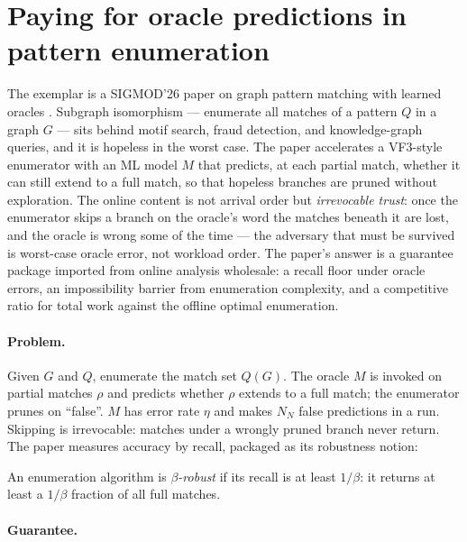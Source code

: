 \section{Paying for oracle predictions in pattern enumeration}
\label{sec:onl-oracle}

The exemplar is a SIGMOD'26 paper on graph pattern matching with learned
oracles \citep{sigmod26-094}. Subgraph isomorphism --- enumerate all matches of
a pattern $Q$ in a graph $G$ --- sits behind motif search, fraud detection, and
knowledge-graph queries, and it is hopeless in the worst case. The paper
accelerates a VF3-style enumerator with an ML model $M$ that predicts, at each
partial match, whether it can still extend to a full match, so that hopeless
branches are pruned without exploration. The online content is not arrival
order but \emph{irrevocable trust}: once the enumerator skips a branch on the
oracle's word the matches beneath it are lost, and the oracle is wrong some of
the time --- the adversary that must be survived is worst-case oracle error,
not workload order. The paper's answer is a guarantee package imported from
online analysis wholesale: a recall floor under oracle errors, an
impossibility barrier from enumeration complexity, and a competitive ratio for
total work against the offline optimal enumeration.

\paragraph{Problem.}
Given $G$ and $Q$, enumerate the match set $Q(G)$. The oracle $M$ is invoked
on partial matches $\rho$ and predicts whether $\rho$ extends to a full match;
the enumerator prunes on ``false''. $M$ has error rate $\eta$ and makes $N_N$
false predictions in a run. Skipping is irrevocable: matches under a wrongly
pruned branch never return. The paper measures accuracy by recall, packaged as
its robustness notion:

\begin{definition}
\label{def:onl-oracle-robust}
An enumeration algorithm is \emph{$\beta$-robust} if its recall is at least
$1/\beta$: it returns at least a $1/\beta$ fraction of all full matches. \eop
\end{definition}

\paragraph{Guarantee.}

